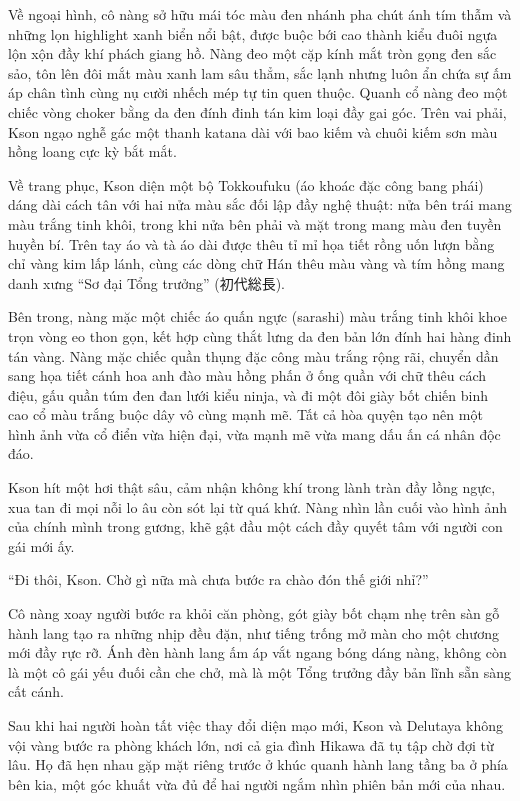 ﻿\documentclass[../main.tex]{subfiles}
\begin{document}
Về ngoại hình, cô nàng sở hữu mái tóc màu đen nhánh pha chút ánh tím thẫm và những lọn highlight xanh biển nổi bật, được buộc bới cao thành kiểu đuôi ngựa lộn xộn đầy khí phách giang hồ. Nàng đeo một cặp kính mắt tròn gọng đen sắc sảo, tôn lên đôi mắt màu xanh lam sâu thẳm, sắc lạnh nhưng luôn ẩn chứa sự ấm áp chân tình cùng nụ cười nhếch mép tự tin quen thuộc. Quanh cổ nàng đeo một chiếc vòng choker bằng da đen đính đinh tán kim loại đầy gai góc. Trên vai phải, Kson ngạo nghễ gác một thanh katana dài với bao kiếm và chuôi kiếm sơn màu hồng loang cực kỳ bắt mắt.


Về trang phục, Kson diện một bộ Tokkoufuku (áo khoác đặc công bang phái) dáng dài cách tân với hai nửa màu sắc đối lập đầy nghệ thuật: nửa bên trái mang màu trắng tinh khôi, trong khi nửa bên phải và mặt trong mang màu đen tuyền huyền bí. Trên tay áo và tà áo dài được thêu tỉ mỉ họa tiết rồng uốn lượn bằng chỉ vàng kim lấp lánh, cùng các dòng chữ Hán thêu màu vàng và tím hồng mang danh xưng ``Sơ đại Tổng trưởng'' (初代総長).

Bên trong, nàng mặc một chiếc áo quấn ngực (sarashi) màu trắng tinh khôi khoe trọn vòng eo thon gọn, kết hợp cùng thắt lưng da đen bản lớn đính hai hàng đinh tán vàng. Nàng mặc chiếc quần thụng đặc công màu trắng rộng rãi, chuyển dần sang họa tiết cánh hoa anh đào màu hồng phấn ở ống quần với chữ thêu cách điệu, gấu quần túm đen đan lưới kiểu ninja, và đi một đôi giày bốt chiến binh cao cổ màu trắng buộc dây vô cùng mạnh mẽ. Tất cả hòa quyện tạo nên một hình ảnh vừa cổ điển vừa hiện đại, vừa mạnh mẽ vừa mang dấu ấn cá nhân độc đáo.

\chrint

Kson hít một hơi thật sâu, cảm nhận không khí trong lành tràn đầy lồng ngực, xua tan đi mọi nỗi lo âu còn sót lại từ quá khứ. Nàng nhìn lần cuối vào hình ảnh của chính mình trong gương, khẽ gật đầu một cách đầy quyết tâm với người con gái mới ấy.

``Đi thôi, Kson. Chờ gì nữa mà chưa bước ra chào đón thế giới nhỉ?''

Cô nàng xoay người bước ra khỏi căn phòng, gót giày bốt chạm nhẹ trên sàn gỗ hành lang tạo ra những nhịp đều đặn, như tiếng trống mở màn cho một chương mới đầy rực rỡ. Ánh đèn hành lang ấm áp vắt ngang bóng dáng nàng, không còn là một cô gái yếu đuối cần che chở, mà là một Tổng trưởng đầy bản lĩnh sẵn sàng cất cánh.

\ct

Sau khi hai người hoàn tất việc thay đổi diện mạo mới, Kson và Delutaya không vội vàng bước ra phòng khách lớn, nơi cả gia đình Hikawa đã tụ tập chờ đợi từ lâu. Họ đã hẹn nhau gặp mặt riêng trước ở khúc quanh hành lang tầng ba ở phía bên kia, một góc khuất vừa đủ để hai người ngắm nhìn phiên bản mới của nhau.
\end{document}
